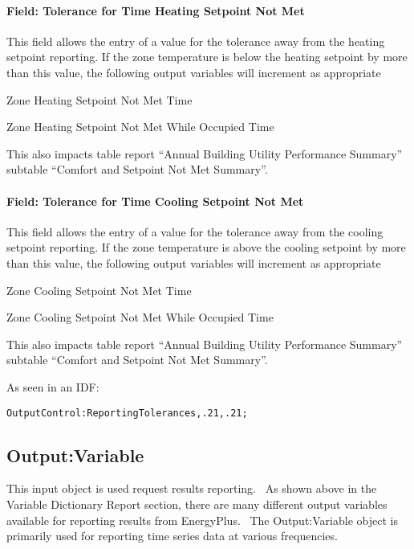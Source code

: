 \paragraph{Field: Tolerance for Time Heating Setpoint Not Met}\label{field-tolerance-for-time-heating-setpoint-not-met}

This field allows the entry of a value for the tolerance away from the heating setpoint reporting. If the zone temperature is below the heating setpoint by more than this value, the following output variables will increment as appropriate

Zone Heating Setpoint Not Met Time

Zone Heating Setpoint Not Met While Occupied Time

This also impacts table report ``Annual Building Utility Performance Summary'' subtable ``Comfort and Setpoint Not Met Summary''.

\paragraph{Field: Tolerance for Time Cooling Setpoint Not Met}\label{field-tolerance-for-time-cooling-setpoint-not-met}

This field allows the entry of a value for the tolerance away from the cooling setpoint reporting. If the zone temperature is above the cooling setpoint by more than this value, the following output variables will increment as appropriate

Zone Cooling Setpoint Not Met Time

Zone Cooling Setpoint Not Met While Occupied Time

This also impacts table report ``Annual Building Utility Performance Summary'' subtable ``Comfort and Setpoint Not Met Summary''.

As seen in an IDF:

\begin{lstlisting}
OutputControl:ReportingTolerances,.21,.21;
\end{lstlisting}

\subsection{Output:Variable}\label{outputvariable}

This input object is used request results reporting.~ As shown above in the Variable Dictionary Report section, there are many different output variables available for reporting results from EnergyPlus.~ The Output:Variable object is primarily used for reporting time series data at various frequencies.

